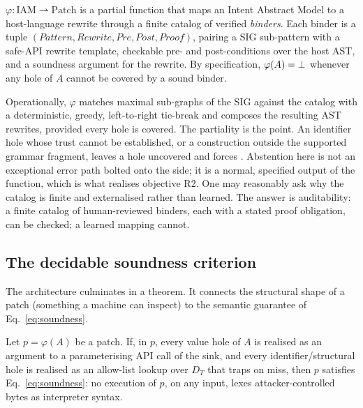 \begin{definition}
\label{def:phi}
$\varphi:\mathrm{IAM}\rightharpoonup\mathrm{Patch}$ is a partial function
that maps an Intent Abstract Model to a host-language rewrite through a
finite catalog of verified \emph{binders}. Each binder is a tuple
$(\mathit{Pattern},\mathit{Rewrite},\mathit{Pre},\mathit{Post},\mathit{Proof})$,
pairing a SIG sub-pattern with a safe-API rewrite template, checkable
pre- and post-conditions over the host AST, and a soundness argument for
the rewrite. By specification, $\varphi(A)=\bot$ whenever any hole of
$A$ cannot be covered by a sound binder.
\end{definition}

Operationally, $\varphi$ matches maximal sub-graphs of the SIG against the
catalog with a deterministic, greedy, left-to-right tie-break and composes
the resulting AST rewrites, provided every hole is covered. The partiality
is the point. An identifier hole whose trust cannot be established, or a
construction outside the supported grammar fragment, leaves a hole
uncovered and forces \bottom{}. Abstention here is not an exceptional error
path bolted onto the side; it is a normal, specified output of the function,
which is what realises objective R2. One may reasonably ask why the catalog
is finite and externalised rather than learned. The answer is auditability:
a finite catalog of human-reviewed binders, each with a stated proof
obligation, can be checked; a learned mapping cannot.

\subsection{The decidable soundness criterion}
\label{sec:thm}

The architecture culminates in a theorem. It connects the structural shape
of a patch (something a machine can inspect) to the semantic guarantee of
Eq.~\eqref{eq:soundness}.

\begin{theorem}
\label{thm:soundness}
Let $p=\varphi(A)$ be a patch. If, in $p$, every \textsf{value} hole of $A$
is realised as an argument to a parameterising API call of the sink, and
every \textsf{identifier}/\textsf{structural} hole is realised as an
allow-list lookup over $D_T$ that traps on miss, then $p$ satisfies
Eq.~\eqref{eq:soundness}: no execution of $p$, on any input, lexes
attacker-controlled bytes as interpreter syntax.
\end{theorem}

